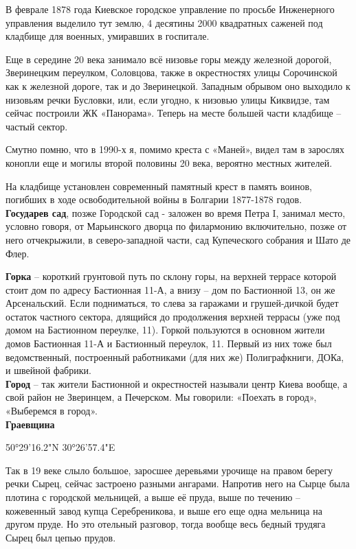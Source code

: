 В феврале 1878 года Киевское городское управление по просьбе Инженерного управления выделило тут землю, 4 десятины 2000 квадратных саженей под кладбище для военных, умиравших в госпитале. 

Еще в середине 20 века занимало всё низовье горы между железной дорогой, Зверинецким переулком, Соловцова, также в окрестностях улицы Сорочинской как к железной дороге, так и до Зверинецкой. Западным обрывом оно выходило к низовьям речки Бусловки, или, если угодно, к низовью улицы Киквидзе, там сейчас построили ЖК «Панорама». Теперь на месте большей части кладбище – частый сектор.

Смутно помню, что в 1990-х я, помимо креста с «Маней», видел там в зарослях конопли еще и могилы второй половины 20 века, вероятно местных жителей.

На кладбище установлен современный памятный крест в память воинов, погибших в ходе освободительной войны в Болгарии 1877-1878 годов.\\


\textbf{Государев сад}, позже Городской сад - заложен во время Петра I, занимал место, условно говоря, от Марьинского дворца по филармонию включительно, позже от него отчекрыжили, в северо-западной части, сад Купеческого собрания и Шато де Флер.

\textbf{Горка} – короткий грунтовой путь по склону горы, на верхней террасе которой стоит дом по адресу Бастионная 11-А, а внизу – дом по Бастионной 13, он же Арсенальский. Если подниматься, то слева за гаражами и грушей-дичкой будет остаток частного сектора, длящийся до продолжения верхней террасы (уже под домом на Бастионном переулке, 11). Горкой пользуются в основном жители домов Бастионная 11-А и Бастионный переулок, 11. Первый из них тоже был ведомственный, построенный работниками (для них же) Полиграфкниги, ДОКа, и швейной фабрики.\\


\textbf{Город} – так жители Бастионной и окрестностей называли центр Киева вообще, а свой район не Зверинцем, а Печерском. Мы говорили: «Поехать в город», «Выберемся в город».\\

\textbf{Граевщина} 

50°29'16.2"N 30°26'57.4"E

Так в 19 веке слыло большое, заросшее деревьями урочище на правом берегу речки Сырец, сейчас застроено разными ангарами. Напротив него на Сырце была плотина с городской мельницей, а выше её пруда, выше по течению – кожевенный завод купца Серебреникова, и выше его еще одна мельница на другом пруде. Но это отельный разговор, тогда вообще весь бедный трудяга Сырец был цепью прудов.\\

